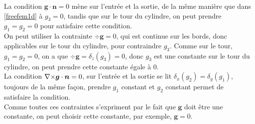 La condition $\bm{g}\cdot\bm{n}=0$ mène sur l'entrée et la sortie, de la même manière que dans \ref{freefem1d} à $g_3=0$, tandis que sur le tour du cylindre, on peut prendre $g_1=g_2=0$ pour satisfaire cette condition.\\

On peut utiliser la contrainte $\div\bm{g}=0$, qui est continue sur les bords, donc applicables sur le tour du cylindre, pour contraindre $g_3$. Comme sur le tour, $g_1=g_2=0$, on a que $\div\bm{g}=\delta_z(g_3)=0$, donc $g_3$ est une constante sur le tour du cylindre, on peut prendre cette constante égale à 0.\\

La condition ${\nabla\times}\bm{g}\cdot\bm{n}=0$, sur l'entrée et la sortie se lit $\delta_x(g_2)=\delta_y(g_1)$, toujours de la même façon, prendre $g_1$ constant et $g_2$ constant permet de satisfaire la condition.\\

Comme toutes ces contraintes s'expriment par le fait que $\bm{g}$ doit être une constante, on peut choisir cette constante, par exemple, $\bm{g}=0$.

\fi


